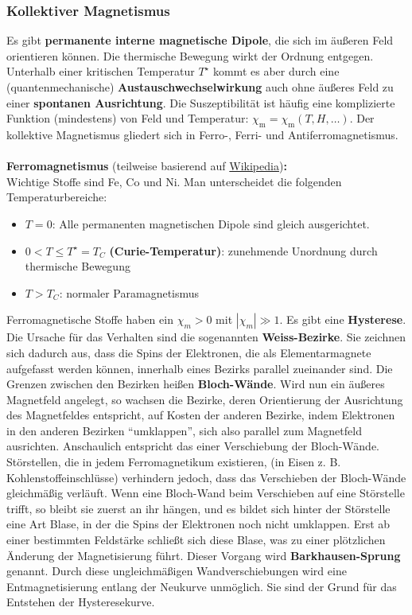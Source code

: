 		  \subsubsection{Kollektiver Magnetismus} 
		  Es gibt \textbf{permanente interne magnetische Dipole}, die sich im äußeren Feld orientieren können. Die thermische Bewegung wirkt der Ordnung entgegen. Unterhalb einer kritischen Temperatur $T^\star$ kommt es aber durch eine (quantenmechanische) \textbf{Austauschwechselwirkung} auch ohne äußeres Feld zu einer \textbf{spontanen Ausrichtung}. Die Suszeptibilität ist häufig eine komplizierte Funktion (mindestens) von Feld und Temperatur:
			              $
				              \chi_\mathrm{m} = \chi_\mathrm{m}(T, H, \dots)
			              $.
			         Der kollektive Magnetismus gliedert sich in Ferro-, Ferri- und Antiferromagnetismus. \\\\
	  \textbf{Ferromagnetismus} (teilweise basierend auf \href{https://de.wikipedia.org/wiki/Ferromagnetismus}{Wikipedia})\textbf{:}\\
	   Wichtige Stoffe sind Fe, Co und Ni. Man unterscheidet die folgenden Temperaturbereiche:
	   \begin{itemize}
	   	\item $T=0$: Alle permanenten magnetischen Dipole sind gleich ausgerichtet.
	   	\item $0<T\le T^\star=T_C$ \textbf{(Curie-Temperatur)}: zunehmende Unordnung durch thermische Bewegung
	   	\item $T>T_C$: normaler Paramagnetismus
	   \end{itemize}
Ferromagnetische Stoffe haben ein $\chi_m > 0$ mit $|\chi_m|\gg 1$. Es gibt eine \textbf{Hysterese}. Die Ursache für das Verhalten sind die sogenannten \textbf{Weiss-Bezirke}. Sie zeichnen sich dadurch aus, dass die Spins der Elektronen, die als Elementarmagnete aufgefasst werden können, innerhalb eines Bezirks parallel zueinander sind. Die Grenzen zwischen den Bezirken heißen \textbf{Bloch-Wände}. Wird nun ein äußeres Magnetfeld angelegt, so wachsen die Bezirke, deren Orientierung der Ausrichtung des Magnetfeldes entspricht, auf Kosten der anderen Bezirke, indem Elektronen in den anderen Bezirken \enquote{umklappen}, sich also parallel zum Magnetfeld ausrichten. Anschaulich entspricht das einer Verschiebung der Bloch-Wände.\\
Störstellen, die in jedem Ferromagnetikum existieren, (in Eisen z. B. Kohlenstoffeinschlüsse) verhindern jedoch, dass das Verschieben der Bloch-Wände gleichmäßig verläuft. Wenn eine Bloch-Wand beim Verschieben auf eine Störstelle trifft, so bleibt sie zuerst an ihr hängen, und es bildet sich hinter der Störstelle eine Art Blase, in der die Spins der Elektronen noch nicht umklappen. Erst ab einer bestimmten Feldstärke schließt sich diese Blase, was zu einer plötzlichen Änderung der Magnetisierung führt. Dieser Vorgang wird \textbf{Barkhausen-Sprung} genannt. Durch diese ungleichmäßigen Wandverschiebungen wird eine Entmagnetisierung entlang der Neukurve unmöglich. Sie sind der Grund für das Entstehen der Hysteresekurve.\\
